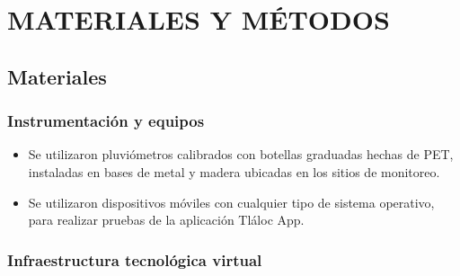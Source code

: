 \chapter{MATERIALES Y MÉTODOS}





\section{Materiales}
\subsection{Instrumentación y equipos}
\begin{itemize}
    \item Se utilizaron pluviómetros calibrados con botellas graduadas hechas de PET, instaladas en bases de metal y madera ubicadas en los sitios de monitoreo.

    \item Se utilizaron dispositivos móviles con cualquier tipo de sistema operativo, para realizar pruebas de la aplicación Tláloc App.
\end{itemize}

\subsection{Infraestructura tecnológica virtual}

